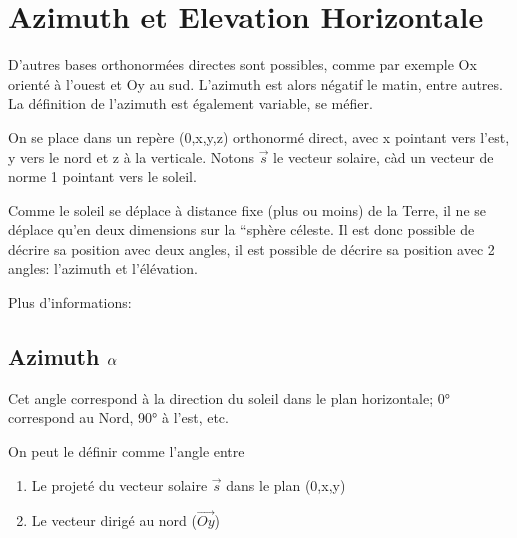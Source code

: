 \documentclass[letterpaper,10pt,english]{sphinxmanual}
\begin{document}
\section{Azimuth et Elevation \sphinxhyphen{} Horizontale}
\label{\detokenize{Part3/EmplacementSoleil:azimuth-et-elevation-horizontale}}
\begin{sphinxShadowBox}

D’autres bases orthonormées directes sont possibles, comme par exemple Ox orienté à l’ouest et Oy au sud. L’azimuth est alors négatif le matin, entre autres. La définition de l’azimuth est également variable, se méfier.
\end{sphinxShadowBox}

On se place dans un repère (0,x,y,z) orthonormé direct, avec x pointant vers l’est, y vers le nord et z à la verticale. Notons \(\vec{s}\) le vecteur solaire, càd un vecteur de norme 1 pointant vers le soleil.

Comme le soleil se déplace à distance fixe (plus ou moins) de la Terre, il ne se déplace qu’en deux dimensions sur la “sphère céleste. Il est donc possible de décrire sa position avec deux angles,  il est possible de décrire sa position avec 2 angles: l’azimuth et l’élévation.


Plus d’informations: 


\subsection{Azimuth \sphinxhyphen{} \protect\(\alpha\protect\)}
\label{\detokenize{Part3/EmplacementSoleil:azimuth-alpha}}

Cet angle correspond à la direction du soleil dans le plan horizontale; 0° correspond au Nord, 90° à l’est, etc.

On peut le définir comme l’angle entre
\begin{enumerate}
%
\item {} 
Le projeté du vecteur solaire \(\vec{s}\) dans le plan (0,x,y)

\item {} 
Le vecteur dirigé au nord (\(\vec{Oy}\))

\end{enumerate}
\end{document}
